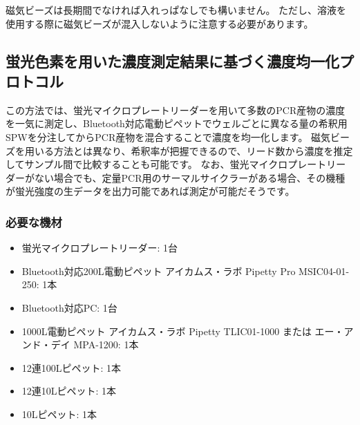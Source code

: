 \documentclass[titlepage,10pt,a4paper,uplatex]{jsbook}
\begin{document}
磁気ビーズは長期間でなければ入れっぱなしでも構いません。
ただし、溶液を使用する際に磁気ビーズが混入しないように注意する必要があります。

\subsection{蛍光色素を用いた濃度測定結果に基づく濃度均一化プロトコル}

この方法では、蛍光マイクロプレートリーダーを用いて多数のPCR産物の濃度を一気に測定し、Bluetooth対応電動ピペットでウェルごとに異なる量の希釈用SPWを分注してからPCR産物を混合することで濃度を均一化します。
磁気ビーズを用いる方法とは異なり、希釈率が把握できるので、リード数から濃度を推定してサンプル間で比較することも可能です。
なお、蛍光マイクロプレートリーダーがない場合でも、定量PCR用のサーマルサイクラーがある場合、その機種が蛍光強度の生データを出力可能であれば測定が可能だそうです。

\subsubsection{必要な機材}
\begin{itemize}
\item 蛍光マイクロプレートリーダー: 1台
\item Bluetooth対応200{\textmu}L電動ピペット アイカムス・ラボ Pipetty Pro MSIC04-01-250: 1本
\item Bluetooth対応PC: 1台
\item 1000{\textmu}L電動ピペット アイカムス・ラボ Pipetty TLIC01-1000 または エー・アンド・デイ MPA-1200: 1本
\item 12連100{\textmu}Lピペット: 1本
\item 12連10{\textmu}Lピペット: 1本
\item 10{\textmu}Lピペット: 1本
\end{itemize}
\end{document}
